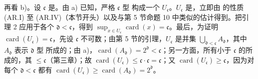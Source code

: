 再看 b)。设 $\mathfrak{c}$ 是。由 a) 已知，严格 $\mathfrak{c}$ 型 构成一个 $U_{\mathfrak{c}}$。$U_{\mathfrak{c}}$ 是，立即由 的性质 (AR.I) 至 (AR.IV)（本节开头）以及与第 5 节命题 10 中类似的估计得到。把引理 2 应用于各个 $\mathfrak{d}<\mathfrak{c}$，得到 $\sup_{x\in U_{\mathfrak{c}}}\operatorname{card}(x)=\mathfrak{c}$。最后，为证明 $\operatorname{card}(U_{\mathfrak{c}})=\mathfrak{c}$，先设 $\mathfrak{c}$ 不可数；由第 5 节的引理，$U_{\mathfrak{c}}$ 是并集 $\bigcup_{\mathfrak{d}<\mathfrak{c}}A_{\mathfrak{d}}$，其中 $A_{\mathfrak{d}}$ 表示 $\mathfrak{d}$ 型 所成的；由 a)，$\operatorname{card}(A_{\mathfrak{d}})=2^{\mathfrak{d}}<\mathfrak{c}$；另一方面，所有小于 $\mathfrak{c}$ 的所成的，其 $\leq\mathfrak{c}$（第三章）；故 $\operatorname{card}(U_{\mathfrak{c}})\leq\mathfrak{c}\cdot\mathfrak{c}=\mathfrak{c}$；又 $\operatorname{card}(U_{\mathfrak{c}})\geq\mathfrak{c}$，因为对每个 $\mathfrak{d}<\mathfrak{c}$ 都有 $\operatorname{card}(U_{\mathfrak{c}})\geq\operatorname{card}(A_{\mathfrak{d}})=2^{\mathfrak{d}}$。

